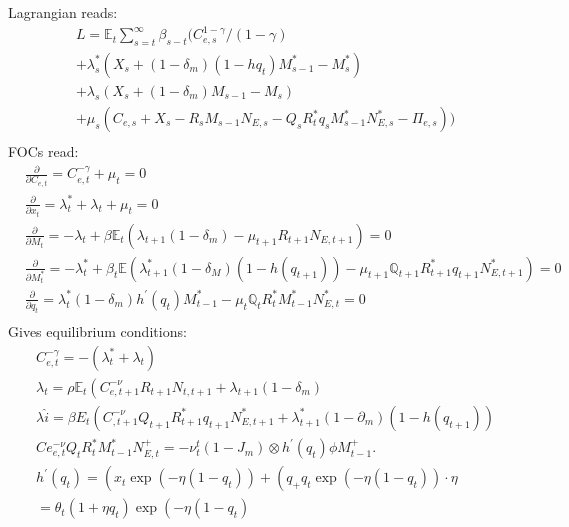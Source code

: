 \documentclass[10pt]{article} %
\begin{document}
    Lagrangian reads:
    \begin{equation}
        \begin{aligned}
        & L = \mathbb{E}_t\sum\limits_{s=t}^{\infty} \beta_{s-t}(C_{e,s}^{1-\gamma}/(1-\gamma)\\
        & +\lambda_s^*\left(X_s+\left(1-\delta_m\right)(1-h{q_t}) M_{s-1}^*-M_s^*\right) \\
        & +\lambda_s\left(X_s+\left(1-\delta_m\right) M_{s-1}-M_s\right) \\
        & +\mu_s\left(C_{e, s}+X_s-R_s M_{s-1} N_{E,s}-Q_s R_t^* q_s M_{s-1}^* N_{E, s}^*-\Pi_{e, s}\right)) \\
        \end{aligned}
    \end{equation}
    FOCs read:
    \begin{equation}
        \begin{aligned}
        & \frac{\partial}{\partial C_{e,t}}=C_{e,t}^{-\gamma}+\mu_t=0 \\
        & \frac{\partial}{\partial x_t}=\lambda_t^*+\lambda_t+\mu_t=0 \\
        & \frac{\partial}{\partial M_t}=-\lambda_t+\beta \mathbb{E}_t\left(\lambda_{t+1}\left(1-\delta_m\right)-\mu_{t+1} R_{t+1} N_{E, t+1}\right)=0 \\
        & \frac{\partial}{\partial M_t^*}=-\lambda_t^*+\beta_t\mathbb{E}\left(\lambda_{t+1}^*\left(1-\delta_M\right)\left(1-h\left(q_{t+1}\right)\right)-\mu_{t+1} \mathbb{Q}_{t+1} R_{t+1}^* q_{t+1} N_{E, t+1}^*\right)=0 \\
        & \frac{\partial}{\partial q_t}=\lambda_t^*\left(1-\delta_m\right) h^{\prime}\left(q_t\right) M_{t-1}^*-\mu_t \mathbb{Q}_t R_t^* M_{t-1}^* N_{E, t}^* =0\\
        \end{aligned}
        \end{equation}
        Gives equilibrium conditions:
        \begin{equation}
            \begin{aligned}
            &C_{e,t}^{-\gamma}=-\left(\lambda_t^*+\lambda_t\right) \\
            & \lambda_t=\rho \mathbb{E}_t\left(C_{e, t+1}^{-\nu} R_{t+1} N_{t, t+1}+\lambda_{t+1}\left(1-\delta_m\right)\right. \\
            & \lambda \hat{i}=\beta E_t\left(C_{, t+1}^{-\nu} Q_{t+1} R_{t+1}^* q_{t+1} N_{E, t+1}^*+\lambda_{t+1}^*\left(1-\partial_m\right)\left(1-h\left(q_{t+1}\right)\right)\right. \\
            & C e_{e, t}^{-\nu} Q_t R_t^* M_{t-1}^* N_{E, t}^{+}=-\nu_t^t\left(1-J_m\right) \otimes h^{\prime}\left(q_t\right) \phi M_{t-1}^{+} \text {. } \\
            & h^{\prime}\left(q_t\right)=\left(x_t \exp \left(-\eta\left(1-q_t\right)\right)+\left(q_{+} q_t \exp \left(-\eta\left(1-q_t\right)\right) \cdot \eta\right.\right. \\
            & =\theta_t\left(1+\eta q_t\right) \exp \left(-\eta\left(1-q_t\right)\right. \\
            &
            \end{aligned}
            \end{equation}

\newpage

\footnotesize


\end{document}
